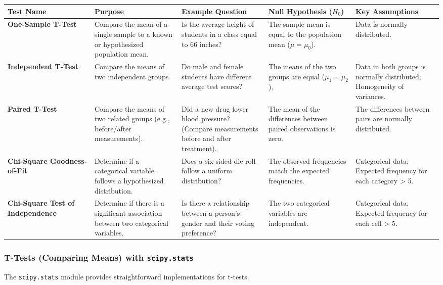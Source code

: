 \documentclass[11pt,a4paper]{article}
\begin{document}
\begin{longtable}{@{}p{0.2\linewidth}p{0.2\linewidth}p{0.2\linewidth}p{0.2\linewidth}p{0.2\linewidth}@{}}
\toprule
\textbf{Test Name} & \textbf{Purpose} & \textbf{Example Question} & \textbf{Null Hypothesis ($H_0$)} & \textbf{Key Assumptions} \\
\midrule
\endhead
\textbf{One-Sample T-Test} & Compare the mean of a single sample to a known or hypothesized population mean. & Is the average height of students in a class equal to 66 inches? & The sample mean is equal to the population mean ($\mu = \mu_0$). & Data is normally distributed. \\
\textbf{Independent T-Test} & Compare the means of two independent groups. & Do male and female students have different average test scores? & The means of the two groups are equal ($\mu_1 = \mu_2$). & Data in both groups is normally distributed; Homogeneity of variances. \\
\textbf{Paired T-Test} & Compare the means of two related groups (e.g., before/after measurements). & Did a new drug lower blood pressure? (Compare measurements before and after treatment). & The mean of the differences between paired observations is zero. & The differences between pairs are normally distributed. \\
\textbf{Chi-Square Goodness-of-Fit} & Determine if a categorical variable follows a hypothesized distribution. & Does a six-sided die roll follow a uniform distribution? & The observed frequencies match the expected frequencies. & Categorical data; Expected frequency for each category > 5. \\
\textbf{Chi-Square Test of Independence} & Determine if there is a significant association between two categorical variables. & Is there a relationship between a person's gender and their voting preference? & The two categorical variables are independent. & Categorical data; Expected frequency for each cell > 5. \\
\bottomrule
\end{longtable}

\subsubsection{T-Tests (Comparing Means) with \texttt{scipy.stats}}

The \texttt{scipy.stats} module provides straightforward implementations for t-tests.
\end{document}
